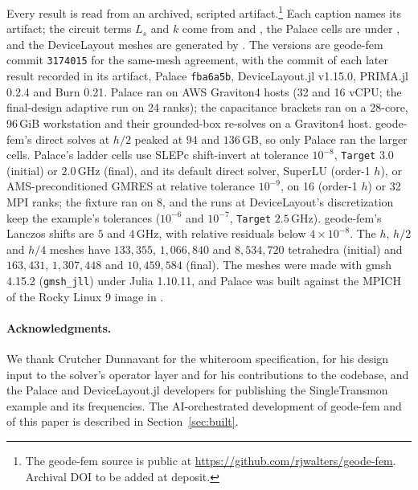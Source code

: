 \documentclass{anvil-paper}
\begin{document}
Every result is read from an archived, scripted artifact.\footnote{The geode-fem source is public at
\url{https://github.com/rjwalters/geode-fem}. Archival DOI to be added at
deposit.}
Each caption names its artifact; the circuit terms $L_s$
and $k$ come from  and
, the Palace cells are under
, and the DeviceLayout meshes are
generated by . The versions are geode-fem commit
\texttt{3174015} for the same-mesh agreement, with the commit of each later
result recorded in its artifact, Palace \texttt{fba6a5b}, DeviceLayout.jl
v1.15.0, PRIMA.jl 0.2.4 and Burn 0.21. Palace ran on AWS
Graviton4 hosts (32 and 16 vCPU; the final-design adaptive run on 24
ranks); the capacitance brackets ran on a 28-core, 96\,GiB workstation and
their grounded-box re-solves on a Graviton4 host. geode-fem's
direct solves at $h/2$ peaked at $94$ and $136$\,GB, so only Palace ran
the larger cells. Palace's ladder cells use SLEPc shift-invert at tolerance $10^{-8}$,
\texttt{Target} $3.0$ (initial) or $2.0$\,GHz (final), and its default
direct solver, SuperLU (order-1 $h$), or AMS-preconditioned GMRES at relative
tolerance $10^{-9}$, on 16 (order-1 $h$) or 32 MPI ranks; the fixture ran
on 8, and the runs at DeviceLayout's discretization keep the example's
tolerances ($10^{-6}$ and $10^{-7}$, \texttt{Target} $2.5$\,GHz). geode-fem's Lanczos shifts are
$5$ and $4$\,GHz, with relative residuals below $4\times10^{-8}$.
The $h$, $h/2$ and $h/4$ meshes have $133{,}355$, $1{,}066{,}840$ and
$8{,}534{,}720$ tetrahedra (initial) and $163{,}431$, $1{,}307{,}448$ and
$10{,}459{,}584$ (final). The meshes were made
with gmsh 4.15.2 (\texttt{gmsh\_jll}) under Julia 1.10.11, and Palace was
built against the MPICH of the Rocky Linux 9 image in
.

\paragraph{Acknowledgments.}
We thank Crutcher Dunnavant for the whiteroom specification, for his
design input to the solver's operator layer and for his contributions to
the codebase, and the Palace and DeviceLayout.jl developers for publishing
the SingleTransmon example and its frequencies. The AI-orchestrated
development of geode-fem and of this paper is described in
Section~\ref{sec:built}.



\end{document}

